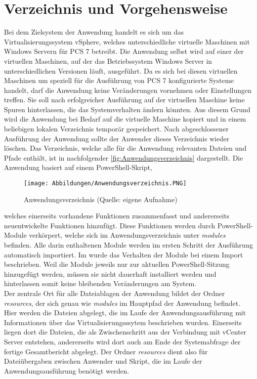 \section{Verzeichnis und Vorgehensweise}
Bei dem Zielsystem der Anwendung handelt es sich um das Virtualisierungssystem vSphere, welches unterschiedliche virtuelle Maschinen mit Windows Servern für  PCS 7 betreibt. Die Anwendung selbst wird auf einer der virtuellen Maschinen, auf der das Betriebssystem Windows Server in unterschiedlichen Versionen läuft, ausgeführt. Da es sich bei diesen virtuellen Maschinen um speziell für die Ausführung von PCS 7 konfigurierte Systeme handelt, darf die Anwendung keine Veränderungen vornehmen oder Einstellungen treffen. Sie soll nach erfolgreicher Ausführung auf der virtuellen Maschine keine Spuren hinterlassen, die das Systemverhalten ändern könnten. Aus diesem Grund wird die Anwendung bei Bedarf auf die virtuelle Maschine kopiert und in einem beliebigen lokalen Verzeichnis temporär gespeichert. Nach abgeschlossener Ausführung der Anwendung sollte der Anwender dieses Verzeichnis wieder löschen. Das Verzeichnis, welche alle für die Anwendung relevanten Dateien und Pfade enthält, ist in nachfolgender \autoref{fig:Anwendungsverzeichnis} dargestellt. Die Anwendung basiert auf einem PowerShell-Skript,
\begin{wrapfigure}[7]{l}{7.7cm}
    \centering
    \texttt{[image: Abbildungen/Anwendungsverzeichnis.PNG]}\caption[Anwendungsverzeichnis]{Anwendungsverzeichnis (Quelle: eigene Aufnahme)}
    \label{fig:Anwendungsverzeichnis}
\end{wrapfigure}
welches einerseits vorhandene Funktionen zusammenfasst und andererseits neuentwickelte Funktionen hinzufügt. Diese Funktionen werden durch PowerShell-Module verkörpert, welche sich im Anwendungsverzeichnis unter \textit{modules} befinden. Alle darin enthaltenen Module werden im ersten Schritt der Ausführung automatisch importiert. Im  wurde das Verhalten der Module bei einem Import beschrieben. Weil die Module jeweils nur zur aktuellen PowerShell-Sitzung hinzugefügt werden, müssen sie nicht dauerhaft installiert werden und hinterlassen somit keine bleibenden Veränderungen am System.\medskip\\
Der zentrale Ort für alle Dateiablagen der Anwendung bildet der Ordner \textit{resources}, der sich genau wie \textit{modules} im Hauptpfad der Anwendung befindet. Hier werden die Dateien abgelegt, die im Laufe der Anwendungsausführung mit Informationen über das Virtualisierungsssytem beschrieben wurden. Einerseits liegen dort die Dateien, die als Zwischenschritt aus der Verbindung mit vCenter Server entstehen, andererseits wird dort auch am Ende der Systemabfrage der fertige Gesamtbericht abgelegt. Der Ordner \textit{resources} dient also für Dateiübergaben zwischen Anwender und Skript, die im Laufe der Anwendungsausführung benötigt werden.\medskip\\
